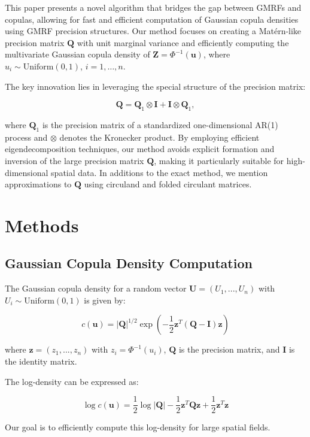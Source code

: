 \documentclass[journal=,manuscript=]{achemso}
\begin{document}
This paper presents a novel algorithm that bridges the gap between GMRFs
and copulas, allowing for fast and efficient computation of Gaussian
copula densities using GMRF precision structures. Our method focuses on
creating a Matérn-like precision matrix \(\mathbf{Q}\) with unit
marginal variance and efficiently computing the multivariate Gaussian
copula density of \(\mathbf{Z} = \Phi^{-1}(\mathbf{u})\), where
\(u_i \sim \text{Uniform}(0, 1)\), \(i = 1, \dots, n\).

The key innovation lies in leveraging the special structure of the
precision matrix:

\[
\mathbf{Q} = \mathbf{Q}_1 \otimes \mathbf{I} + \mathbf{I} \otimes \mathbf{Q}_1,
\]

where \(\mathbf{Q}_1\) is the precision matrix of a standardized
one-dimensional AR(1) process and \(\otimes\) denotes the Kronecker
product. By employing efficient eigendecomposition techniques, our
method avoids explicit formation and inversion of the large precision
matrix \(\mathbf{Q}\), making it particularly suitable for
high-dimensional spatial data. In additions to the exact method, we
mention approximations to \(\mathbf{Q}\) using circuland and folded
circulant matrices.

\section{Methods}\label{methods}

\subsection{Gaussian Copula Density
Computation}\label{gaussian-copula-density-computation}

The Gaussian copula density for a random vector
\(\mathbf{U} = (U_1, ..., U_n)\) with \(U_i \sim \text{Uniform}(0,1)\)
is given by:

\[
c(\mathbf{u}) = |\mathbf{Q}|^{1/2} \exp\left(-\frac{1}{2}\mathbf{z}^T(\mathbf{Q} - \mathbf{I})\mathbf{z}\right)
\]

where \(\mathbf{z} = (z_1, ..., z_n)\) with \(z_i = \Phi^{-1}(u_i)\),
\(\mathbf{Q}\) is the precision matrix, and \(\mathbf{I}\) is the
identity matrix.

The log-density can be expressed as:

\[
\log c(\mathbf{u}) = \frac{1}{2}\log|\mathbf{Q}| - \frac{1}{2}\mathbf{z}^T\mathbf{Q}\mathbf{z} + \frac{1}{2}\mathbf{z}^T\mathbf{z}
\]

Our goal is to efficiently compute this log-density for large spatial
fields.
\end{document}
